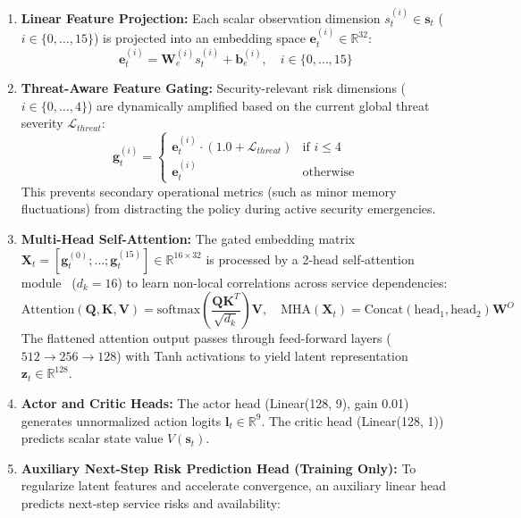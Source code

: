 \documentclass[11pt,a4paper]{article}
\begin{document}
\begin{enumerate}
    \item \textbf{Linear Feature Projection:} Each scalar observation dimension $s_t^{(i)} \in \mathbf{s}_t$ ($i \in \{0, \ldots, 15\}$) is projected into an embedding space $\mathbf{e}_t^{(i)} \in \mathbb{R}^{32}$:
    \begin{equation}
        \mathbf{e}_t^{(i)} = \mathbf{W}_e^{(i)} s_t^{(i)} + \mathbf{b}_e^{(i)}, \quad i \in \{0, \ldots, 15\}
    \end{equation}
    \item \textbf{Threat-Aware Feature Gating:} Security-relevant risk dimensions ($i \in \{0, \ldots, 4\}$) are dynamically amplified based on the current global threat severity $\mathcal{L}_{threat}$:
    \begin{equation}
        \mathbf{g}_t^{(i)} = \begin{cases}
            \mathbf{e}_t^{(i)} \cdot \left(1.0 + \mathcal{L}_{threat}\right) & \text{if } i \le 4 \\
            \mathbf{e}_t^{(i)} & \text{otherwise}
        \end{cases}
    \end{equation}
    This prevents secondary operational metrics (such as minor memory fluctuations) from distracting the policy during active security emergencies.
    \item \textbf{Multi-Head Self-Attention:} The gated embedding matrix $\mathbf{X}_t = [\mathbf{g}_t^{(0)}; \ldots; \mathbf{g}_t^{(15)}] \in \mathbb{R}^{16 \times 32}$ is processed by a 2-head self-attention module~\cite{vaswani2017attention} ($d_k = 16$) to learn non-local correlations across service dependencies:
    \begin{equation}
        \text{Attention}(\mathbf{Q}, \mathbf{K}, \mathbf{V}) = \text{softmax}\left(\frac{\mathbf{Q}\mathbf{K}^T}{\sqrt{d_k}}\right)\mathbf{V}, \quad \text{MHA}(\mathbf{X}_t) = \text{Concat}(\text{head}_1, \text{head}_2) \mathbf{W}^O
    \end{equation}
    The flattened attention output passes through feed-forward layers ($512 \rightarrow 256 \rightarrow 128$) with Tanh activations to yield latent representation $\mathbf{z}_t \in \mathbb{R}^{128}$.
    \item \textbf{Actor and Critic Heads:} The actor head (Linear(128, 9), gain 0.01) generates unnormalized action logits $\mathbf{l}_t \in \mathbb{R}^9$. The critic head (Linear(128, 1)) predicts scalar state value $V(\mathbf{s}_t)$.
    \item \textbf{Auxiliary Next-Step Risk Prediction Head (Training Only):} To regularize latent features and accelerate convergence, an auxiliary linear head predicts next-step service risks and availability:

\end{enumerate}
\end{document}
